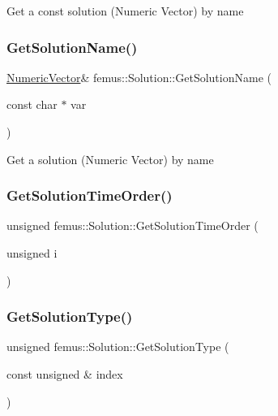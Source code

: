 Get a const solution (Numeric Vector) by name \mbox{\label{classfemus_1_1_solution_ab74a23ebbeb722654d823ea301be51e2}} 
\subsubsection{\texorpdfstring{Get\+Solution\+Name()}{GetSolutionName()}\hspace{0.1cm}{\footnotesize\ttfamily [2/2]}}
{\footnotesize\ttfamily \mbox{\hyperlink{classfemus_1_1_numeric_vector}{Numeric\+Vector}}\& femus\+::\+Solution\+::\+Get\+Solution\+Name (\begin{DoxyParamCaption}\item[{const char $\ast$}]{var }\end{DoxyParamCaption})\hspace{0.3cm}{\ttfamily [inline]}}

Get a solution (Numeric Vector) by name \mbox{\label{classfemus_1_1_solution_af76dbb0089f696728146383d073b5205}} 
\subsubsection{\texorpdfstring{Get\+Solution\+Time\+Order()}{GetSolutionTimeOrder()}}
{\footnotesize\ttfamily unsigned femus\+::\+Solution\+::\+Get\+Solution\+Time\+Order (\begin{DoxyParamCaption}\item[{unsigned}]{i }\end{DoxyParamCaption})\hspace{0.3cm}{\ttfamily [inline]}}

\mbox{\label{classfemus_1_1_solution_a419e9dba724a5e6e460c357c59119c02}} 
\subsubsection{\texorpdfstring{Get\+Solution\+Type()}{GetSolutionType()}}
{\footnotesize\ttfamily unsigned femus\+::\+Solution\+::\+Get\+Solution\+Type (\begin{DoxyParamCaption}\item[{const unsigned \&}]{index }\end{DoxyParamCaption})\hspace{0.3cm}{\ttfamily [inline]}}

